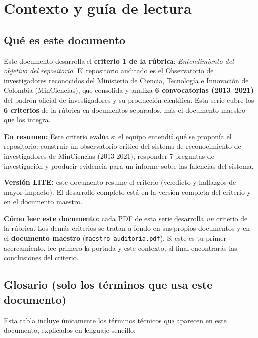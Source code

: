 \section{Contexto y guía de lectura}

\subsection{Qué es este documento}

Este documento desarrolla el \textbf{criterio 1 de la rúbrica}:
\emph{Entendimiento del objetivo del repositorio}. El repositorio auditado es el
Observatorio de investigadores reconocidos del Ministerio de Ciencia,
Tecnología e Innovación de Colombia (MinCiencias), que consolida y analiza
\textbf{6 convocatorias (2013--2021)} del padrón oficial de investigadores
y su producción científica. Esta serie cubre los \textbf{6 criterios} de la
rúbrica en documentos separados, más el documento maestro que los integra.

\textbf{En resumen:} Este criterio evalúa si el equipo entendió qué se proponía el repositorio: construir un observatorio crítico del sistema de reconocimiento de investigadores de MinCiencias (2013-2021), responder 7 preguntas de investigación y producir evidencia para un informe sobre las falencias del sistema.


\begin{tcolorbox}[nota]\textbf{Versión LITE:} este documento resume el criterio (veredicto y hallazgos de mayor impacto). El desarrollo completo está en la versión completa del criterio y en el documento maestro.\end{tcolorbox}

\begin{tcolorbox}[nota]
\textbf{Cómo leer este documento:} cada PDF de esta serie desarrolla \emph{un}
criterio de la rúbrica. Los demás criterios se tratan a fondo en sus propios
documentos y en el \textbf{documento maestro} (\texttt{maestro\_auditoria.pdf}).
Si este es tu primer acercamiento, lee primero la portada y este contexto; al
final encontrarás las conclusiones del criterio.
\end{tcolorbox}

\subsection{Glosario (solo los términos que usa este documento)}

Esta tabla incluye únicamente los términos técnicos que aparecen en este
documento, explicados en lenguaje sencillo:

